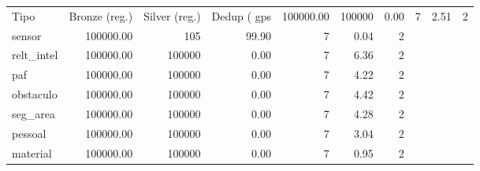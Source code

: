 \begin{tabular}{lrrrrrr}
\toprule
Tipo & Bronze (reg.) & Silver (reg.) & Dedup (%
\midrule
gps & 100000.00 & 100000 & 0.00 & 7 & 2.51 & 2 \\
sensor & 100000.00 & 105 & 99.90 & 7 & 0.04 & 2 \\
relt_intel & 100000.00 & 100000 & 0.00 & 7 & 6.36 & 2 \\
paf & 100000.00 & 100000 & 0.00 & 7 & 4.22 & 2 \\
obstaculo & 100000.00 & 100000 & 0.00 & 7 & 4.42 & 2 \\
seg_area & 100000.00 & 100000 & 0.00 & 7 & 4.28 & 2 \\
pessoal & 100000.00 & 100000 & 0.00 & 7 & 3.04 & 2 \\
material & 100000.00 & 100000 & 0.00 & 7 & 0.95 & 2 \\
\bottomrule
\end{tabular}
